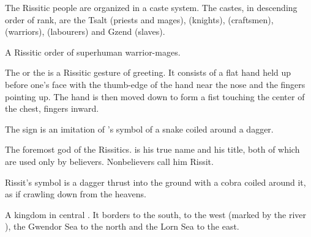 \begin{gloss}
\index{\Rekkan}
\index{\Bedhin}
\index{\Kyth}
\index{\Hok}
The Rissitic people are organized in a caste system. 
The castes, in descending order of rank, are the Tsalt (priests and mages), \Rekkan{} (knights), \Bedhin{} (craftsmen), \Kyth{} (warriors), \Hok{} (labourers) and Gzend (slaves). 






\begin{subgloss}
  \begin{comment}
  \subparagraph{\Ashenoch}
  \end{comment}
  A Rissitic order of superhuman warrior-mages. 




  \begin{comment}
  \subparagraph{dagger sign}
  \end{comment}
  The  or the  is a Rissitic gesture of greeting. 
  It consists of a flat hand held up before one's face with the thumb-edge of the hand near the nose and the fingers pointing up. 
  The hand is then moved down to form a fist touching the center of the chest, fingers inward. 
  
  The sign is an imitation of 's symbol of a snake coiled around a dagger. 
  
  
  
  
  \begin{comment}
  \subparagraph{\HriistN}
  \end{comment}
  \index{\Nechsain}
  The foremost god of the {Rissitics}. \Hriist{} is his true name and \Nechsain{} his title, both of which are used only by believers. Nonbelievers call him Rissit. 
  
  Rissit's symbol is a dagger thrust into the ground with a cobra coiled around it, as if crawling down from the heavens. 
\end{subgloss}







\begin{comment}
\paragraph{Runger}
\end{comment}
A kingdom in central . 
It borders  to the south,  to the west (marked by the river ), the Gwendor Sea to the north and the Lorn Sea to the east. 


\end{gloss}
